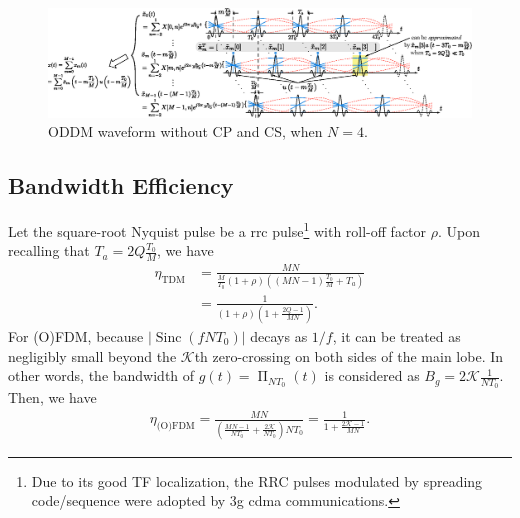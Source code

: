 \documentclass[journal]{IEEEtran}
\DeclareMathOperator{\sinc}{Sinc}
\DeclareMathOperator{\rect}{\Pi}
\begin{document}
\setcounter{figure}{15}

\begin{figure}
  \centering
  \includegraphics[width=0.96\linewidth]{oddm_waveform}
  \caption{ODDM waveform without CP and CS, when $N=4$.}
  \label{oddmwaveform}
\end{figure}

\subsection{Bandwidth Efficiency}
Let the square-root Nyquist pulse be a \ac{rrc} pulse\footnote{Due to its good TF localization, the RRC pulses modulated by spreading code/sequence were adopted by \ac{3g} \ac{cdma} communications.} with roll-off factor  $\rho$. Upon recalling that $T_a=2Q\frac{T_0}{M}$, we have
\begin{align}
  \eta_{\textrm{TDM}} & =\frac{MN}{\frac{M}{T_0}(1+\rho)((MN-1)\frac{T_0}{M}+T_a)}\nonumber \\
                      & =\frac{1}{(1+\rho)(1+\frac{2Q-1}{MN}) }.
\end{align}
For (O)FDM, because $|\sinc(fNT_0)|$ decays as $1/f$, it can be treated as negligibly small {beyond the $\mathcal K$th zero-crossing on both sides of the main lobe}. In other words, the bandwidth of $g(t)=\rect_{NT_0}(t)$ is considered as $B_g=2\mathcal K\frac{1}{NT_0}$. Then, we have
\begin{align}
  \eta_{\textrm{(O)FDM}}=\frac{MN}{(\frac{MN-1}{NT_0}+\frac{2\mathcal K}{NT_0})NT_0}=\frac{1}{1+\frac{2\mathcal K-1}{MN}}.
\end{align}
\end{document}
